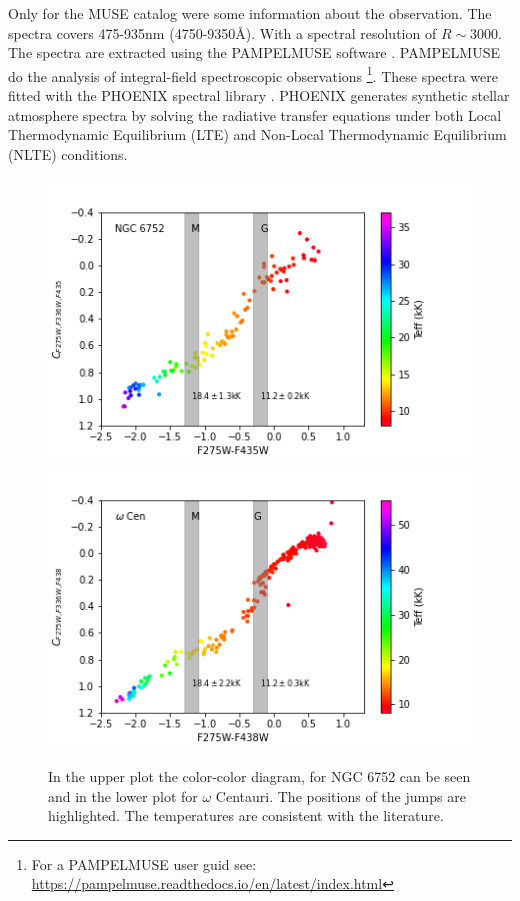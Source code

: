 \documentclass{aa}
\begin{document}
Only for the MUSE catalog were some information about the observation. The spectra covers 475-935nm (4750-9350\AA). With a spectral resolution of $R \sim 3000$. The spectra are extracted using the PAMPELMUSE software \citep{2013A&A...549A..71K, 2018MNRAS.473.5591K}. PAMPELMUSE do the analysis of integral-field spectroscopic observations \footnote{For a PAMPELMUSE user guid see: \href{https://pampelmuse.readthedocs.io/en/latest/index.html}{https://pampelmuse.readthedocs.io/en/latest/index.html}}. These spectra were fitted with the PHOENIX spectral library \cite{2013A&A...553A...6H}. PHOENIX generates synthetic stellar atmosphere spectra by solving the radiative transfer equations under both Local Thermodynamic Equilibrium (LTE) and Non-Local Thermodynamic Equilibrium (NLTE) conditions.


\begin{figure}
        \centering
        \includegraphics[width=\hsize]{NGC6752.png}
        \includegraphics[width=\hsize]{wCen.png}
        \caption{In the upper plot the color-color diagram, for NGC 6752 can be seen and in the lower plot for $\omega$ Centauri. The positions of the jumps are highlighted. The temperatures are consistent with the literature. }
        \label{fig:C-C_self}
\end{figure}
\end{document}
